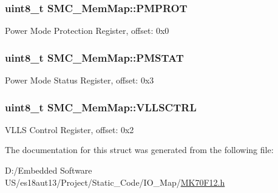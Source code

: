 \subsubsection[{P\+M\+P\+R\+O\+T}]{\setlength{\rightskip}{0pt plus 5cm}uint8\+\_\+t S\+M\+C\+\_\+\+Mem\+Map\+::\+P\+M\+P\+R\+O\+T}\label{struct_s_m_c___mem_map_afd03d93a7823dc65f53216dca15a2a95}
Power Mode Protection Register, offset\+: 0x0 \hypertarget{struct_s_m_c___mem_map_a0fddef87e229c4cf1b3be0d29589e964}{}
\subsubsection[{P\+M\+S\+T\+A\+T}]{\setlength{\rightskip}{0pt plus 5cm}uint8\+\_\+t S\+M\+C\+\_\+\+Mem\+Map\+::\+P\+M\+S\+T\+A\+T}\label{struct_s_m_c___mem_map_a0fddef87e229c4cf1b3be0d29589e964}
Power Mode Status Register, offset\+: 0x3 \hypertarget{struct_s_m_c___mem_map_ad5b37041739800b7bb7afc59d53c7ded}{}
\subsubsection[{V\+L\+L\+S\+C\+T\+R\+L}]{\setlength{\rightskip}{0pt plus 5cm}uint8\+\_\+t S\+M\+C\+\_\+\+Mem\+Map\+::\+V\+L\+L\+S\+C\+T\+R\+L}\label{struct_s_m_c___mem_map_ad5b37041739800b7bb7afc59d53c7ded}
V\+L\+L\+S Control Register, offset\+: 0x2 

The documentation for this struct was generated from the following file\+:\begin{DoxyCompactItemize}
\item 
D\+:/\+Embedded Software U\+S/es18aut13/\+Project/\+Static\+\_\+\+Code/\+I\+O\+\_\+\+Map/\hyperlink{_m_k70_f12_8h}{M\+K70\+F12.\+h}\end{DoxyCompactItemize}
